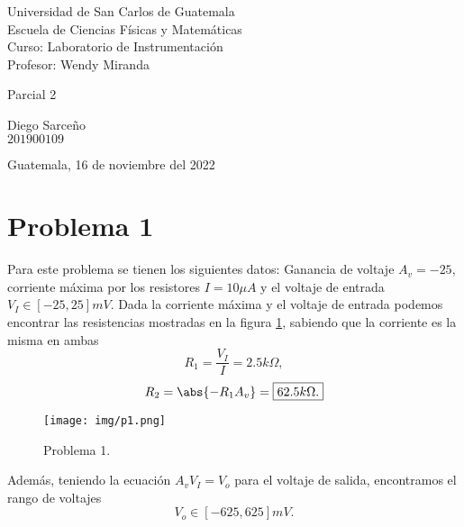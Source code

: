 \documentclass[conference]{IEEEtran}
\begin{document}
\begin{titlepage}



\begin{flushleft}
    Universidad de San Carlos de Guatemala \\
    Escuela de Ciencias Físicas y Matemáticas \\
    Curso: Laboratorio de Instrumentación \\
    Profesor: Wendy Miranda
\end{flushleft}

\vspace{8cm}

\begin{center}
    \huge{Parcial 2}
\end{center}

\vspace{10cm}

\begin{flushright}
    Diego Sarceño \\
    $201900109$
\end{flushright}

\vspace{0.5cm}

\begin{center}
    Guatemala, 16 de noviembre del 2022
\end{center}

\end{titlepage}



\section{Problema 1}
Para este problema se tienen los siguientes datos: Ganancia de voltaje $A_v = -25$, corriente máxima por los resistores $I = 10\mu A$ y el voltaje de entrada $V_I \in [-25,25]mV$. Dada la corriente máxima y el voltaje de entrada podemos encontrar las resistencias mostradas en la figura \ref{p1}, sabiendo que la corriente es la misma en ambas
	$$ R_1 = \frac{V_I}{I} = \boxed{ 2.5k\Omega , } $$
	$$ R_2 = \abs{-R_1 A_v} = \boxed{ 62.5k\Omega . } $$


\begin{figure}[H]
	\centering
	\texttt{[image: img/p1.png]}
	\caption{Problema 1.}
	\label{p1}
\end{figure}

Además, teniendo la ecuación $A_v V_I = V_o$ para el voltaje de salida, encontramos el rango de voltajes
	$$ \boxed{ V_o \in [-625,625]mV . } $$
\\
\end{document}
